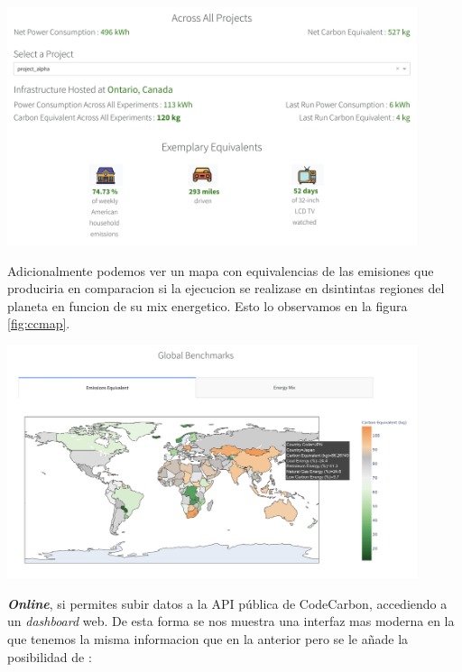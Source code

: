 \documentclass[12pt,a4paper]{report}
\begin{document}
\begin{center}
  \includegraphics[width=0.9\textwidth]{imagenes/CC_1.png}
  \label{fig:ccoffline}
\end{center}

Adicionalmente podemos ver un mapa con equivalencias de las emisiones que produciria en comparacion si la ejecucion se realizase en dsintintas regiones del planeta en funcion de su mix energetico. Esto lo observamos en la figura \ref{fig:ccmap}.

\begin{center}
  \includegraphics[width=0.9\textwidth]{imagenes/CC_2.png}
  \label{fig:ccmap}
\end{center}

\textbf{\textit{Online}}, si permites subir datos a la API pública de CodeCarbon, accediendo a un \textit{dashboard} web. De esta forma se nos muestra una interfaz mas moderna en la que tenemos la misma informacion que en la anterior pero se le añade la posibilidad de :
\end{document}
